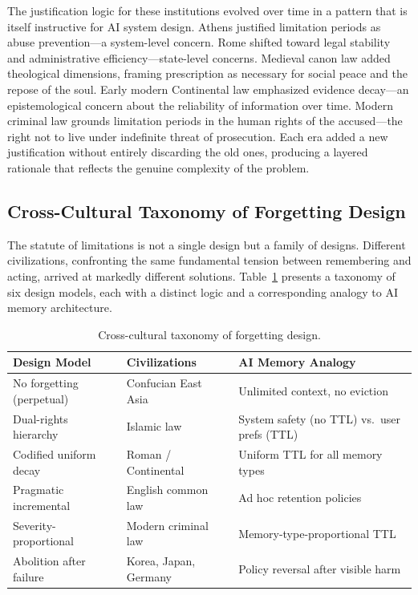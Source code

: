 \documentclass[12pt]{article}
\begin{document}
The justification logic for these institutions evolved over time in a pattern that is itself instructive for AI system design. Athens justified limitation periods as abuse prevention---a system-level concern. Rome shifted toward legal stability and administrative efficiency---state-level concerns. Medieval canon law added theological dimensions, framing prescription as necessary for social peace and the repose of the soul. Early modern Continental law emphasized evidence decay---an epistemological concern about the reliability of information over time. Modern criminal law grounds limitation periods in the human rights of the accused---the right not to live under indefinite threat of prosecution. Each era added a new justification without entirely discarding the old ones, producing a layered rationale that reflects the genuine complexity of the problem.

\subsection{Cross-Cultural Taxonomy of Forgetting Design}
\label{sec:taxonomy}

The statute of limitations is not a single design but a family of designs. Different civilizations, confronting the same fundamental tension between remembering and acting, arrived at markedly different solutions. Table~\ref{tab:taxonomy} presents a taxonomy of six design models, each with a distinct logic and a corresponding analogy to AI memory architecture.

\begin{table}[ht]
\centering
\caption{Cross-cultural taxonomy of forgetting design.}
\label{tab:taxonomy}
\begin{tabular}{@{}lll@{}}
\toprule
Design Model & Civilizations & AI Memory Analogy \\
\midrule
No forgetting (perpetual) & Confucian East Asia & Unlimited context, no eviction \\
Dual-rights hierarchy & Islamic law & System safety (no TTL) vs.\ user prefs (TTL) \\
Codified uniform decay & Roman / Continental & Uniform TTL for all memory types \\
Pragmatic incremental & English common law & Ad hoc retention policies \\
Severity-proportional & Modern criminal law & Memory-type-proportional TTL \\
Abolition after failure & Korea, Japan, Germany & Policy reversal after visible harm \\
\bottomrule
\end{tabular}
\end{table}
\end{document}
